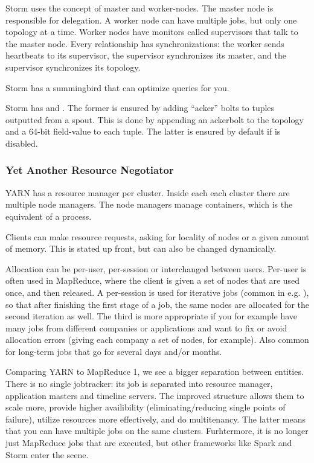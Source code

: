Storm uses the concept of master and worker-nodes. The master node is responsible for delegation.
A worker node can have multiple jobs, but only one topology at a time. Worker nodes have 
monitors called supervisors that talk to the master node.
Every relationship has synchronizations: the worker sends heartbeats to its supervisor, the supervisor
synchronizes its master,  and the supervisor synchronizes its topology.

Storm has a summingbird that can optimize queries for you.

Storm has  and . The former is ensured
by adding ``acker'' bolts to tuples outputted from a spout. This is done by appending
an ackerbolt to the topology and a 64-bit field-value to each tuple. The latter is
ensured by default if  is disabled.


\subsubsection{Yet Another Resource Negotiator}\label{sec:YARN}
YARN has a resource manager per cluster. Inside each each cluster there are multiple
node managers. The node managers manage containers, which is the equivalent of 
a process.

Clients can make resource requests, asking for locality of nodes or a given amount of memory.
This is stated up front, but can also be changed dynamically.

Allocation can be per-user, per-session or interchanged between users.
Per-user is often used in MapReduce, where the client is given a set of nodes
that are used once, and then released.
A per-session is used for iterative jobs (common in e.g. ), so that
after finishing the first stage of a job, the same nodes are allocated for the second iteration as well.
The third is more appropriate if you for example have many jobs from different companies or applications
and want to fix or avoid allocation errors (giving each company a set of nodes, for example).
Also common for long-term jobs that go for several days and/or months.

Comparing YARN to MapReduce 1, we see a bigger separation between entities. There 
is no single jobtracker: its job is separated into resource manager, application masters
and timeline servers. The improved structure allows them to scale more, provide higher
availibility (eliminating/reducing single points of failure), utilize resources more effectively,
and do multitenancy. The latter means that you can have multiple jobs on the same clusters. Furhtermore,
it is no longer just MapReduce jobs that are executed, but other frameworks like Spark and Storm enter the scene.

